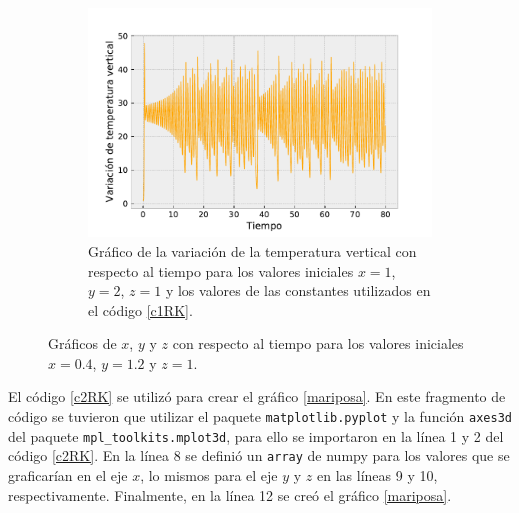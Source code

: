 \documentclass[../portafolio.tex]{subfiles}
\begin{document}
\begin{figure}[h]
\begin{subfigure}[b]{0.3\textwidth}
    \end{subfigure}
    \hfill
    \begin{subfigure}[b]{0.3\textwidth}
         \centering
         \includegraphics[width=\textwidth]{tex/img/ej2_RK_graf02.pdf}
         \caption{Gráfico de la variación de la temperatura vertical con respecto al tiempo para los valores iniciales $x=1$, $y=2$, $z=1$ y los valores de las constantes utilizados en el código \ref{c1RK}. }
         \label{RKgraf6}
     \end{subfigure}
    \caption{Gráficos de $x$, $y$ y $z$ con respecto al tiempo para los valores iniciales $x=0.4$, $y=1.2$ y $z=1$.}
    \label{RK_graf_ej1}
\end{figure}





El código \ref{c2RK} se utilizó para crear el gráfico \ref{mariposa}. En este fragmento de código se tuvieron que utilizar el paquete \texttt{matplotlib.pyplot} y la función \texttt{axes3d} del paquete \texttt{mpl\_toolkits.mplot3d}, para ello se importaron en la línea 1 y 2 del código \ref{c2RK}. En la línea 8 se definió un \texttt{array} de numpy para los valores que se graficarían en el eje $x$, lo mismos para el eje $y$ y $z$ en las líneas 9 y 10, respectivamente. Finalmente, en la línea 12 se creó el gráfico \ref{mariposa}.


\end{document}
